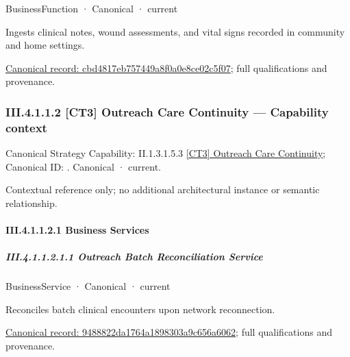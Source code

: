 \label{element:cbd4817eb757449a8f0a0e8ce02c5f07}
{\small BusinessFunction · Canonical · current}\par

Ingests clinical notes, wound assessments, and vital signs recorded in community and home settings.


{\footnotesize \href{../../../../../../../continuum/business/business-function/cbd4817eb757449a8f0a0e8ce02c5f07.md}{Canonical record: cbd4817eb757449a8f0a0e8ce02c5f07}; full qualifications and provenance.}\par
\subsubsection*{III.4.1.1.2 [CT3] Outreach Care Continuity — Capability context}
\label{navigation:III.4.1.1.2}

{\small Canonical Strategy Capability: II.1.3.1.5.3 \hyperref[element:8526d971b07f40de84ef05b0d192089c]{[CT3] Outreach Care Continuity}; Canonical ID: \texttt{}. Canonical · current.}\par
Contextual reference only; no additional architectural instance or semantic relationship.\par
\paragraph*{III.4.1.1.2.1 Business Services}
\label{navigation:III.4.1.1.2.1}

\subparagraph*{III.4.1.1.2.1.1 Outreach Batch Reconciliation Service}
\label{navigation:III.4.1.1.2.1.1}

\label{element:9488822da1764a1898303a9c656a6062}
{\small BusinessService · Canonical · current}\par

Reconciles batch clinical encounters upon network reconnection.


{\footnotesize \href{../../../../../../../continuum/business/business-service/9488822da1764a1898303a9c656a6062.md}{Canonical record: 9488822da1764a1898303a9c656a6062}; full qualifications and provenance.}\par
